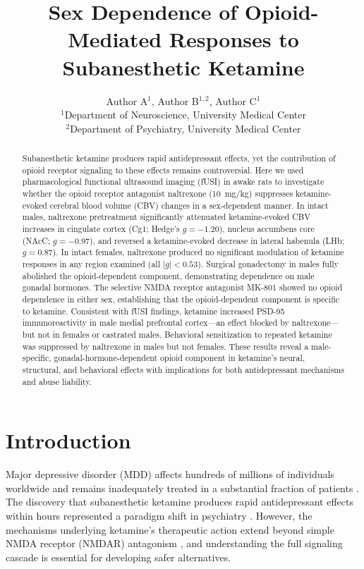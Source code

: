 \documentclass[11pt]{article}
\title{Sex Dependence of Opioid-Mediated Responses to Subanesthetic Ketamine}
\author{Author A$^{1}$, Author B$^{1,2}$, Author C$^{1}$ \\
\small $^{1}$Department of Neuroscience, University Medical Center \\
\small $^{2}$Department of Psychiatry, University Medical Center}
\date{}
\begin{document}
\maketitle

\begin{abstract}
Subanesthetic ketamine produces rapid antidepressant effects, yet the contribution of opioid receptor signaling to these effects remains controversial. Here we used pharmacological functional ultrasound imaging (fUSI) in awake rats to investigate whether the opioid receptor antagonist naltrexone (10~mg/kg) suppresses ketamine-evoked cerebral blood volume (CBV) changes in a sex-dependent manner. In intact males, naltrexone pretreatment significantly attenuated ketamine-evoked CBV increases in cingulate cortex (Cg1; Hedge's $g = -1.20$), nucleus accumbens core (NAcC; $g = -0.97$), and reversed a ketamine-evoked decrease in lateral habenula (LHb; $g = 0.87$). In intact females, naltrexone produced no significant modulation of ketamine responses in any region examined (all $|g| < 0.53$). Surgical gonadectomy in males fully abolished the opioid-dependent component, demonstrating dependence on male gonadal hormones. The selective NMDA receptor antagonist MK-801 showed no opioid dependence in either sex, establishing that the opioid-dependent component is specific to ketamine. Consistent with fUSI findings, ketamine increased PSD-95 immunoreactivity in male medial prefrontal cortex---an effect blocked by naltrexone---but not in females or castrated males. Behavioral sensitization to repeated ketamine was suppressed by naltrexone in males but not females. These results reveal a male-specific, gonadal-hormone-dependent opioid component in ketamine's neural, structural, and behavioral effects with implications for both antidepressant mechanisms and abuse liability.
\end{abstract}

\section{Introduction}

Major depressive disorder (MDD) affects hundreds of millions of individuals worldwide and remains inadequately treated in a substantial fraction of patients \citep{zarate2006randomized}. The discovery that subanesthetic ketamine produces rapid antidepressant effects within hours represented a paradigm shift in psychiatry \citep{berman2000antidepressant, zarate2006randomized}. However, the mechanisms underlying ketamine's therapeutic action extend beyond simple NMDA receptor (NMDAR) antagonism \citep{zanos2016nmdar, moghaddam1997activation}, and understanding the full signaling cascade is essential for developing safer alternatives.
\end{document}
